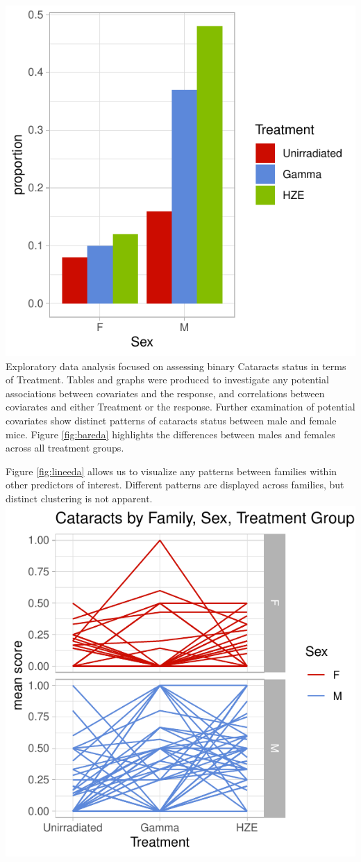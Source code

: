 \documentclass[12pt]{article}
\begin{document}
\includegraphics{bookdown_report_files/figure-latex/bareda-1.pdf}
Exploratory data analysis focused on assessing binary Cataracts status in terms of Treatment. Tables and graphs were produced to investigate any potential associations between covariates and the response, and correlations between coviarates and either Treatment or the response. Further examination of potential covariates show distinct patterns of cataracts status between male and female mice. Figure \ref{fig:bareda} highlights the differences between males and females across all treatment groups.

Figure \ref{fig:lineeda} allows us to visualize any patterns between families within other predictors of interest. Different patterns are displayed across families, but distinct clustering is not apparent.\\
\includegraphics{bookdown_report_files/figure-latex/lineeda-1.pdf}
\end{document}
